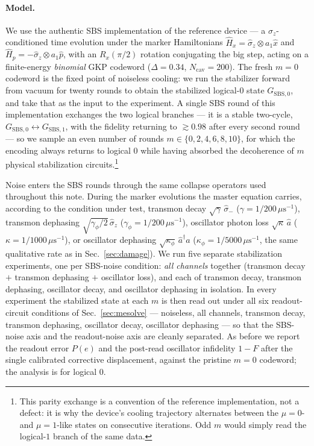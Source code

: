 \paragraph{Model.} We use the authentic SBS implementation of the reference
device --- a $\sigma_z$-conditioned time evolution under the marker Hamiltonians
$\hat H_x=\hat\sigma_z\otimes a_1\hat x$ and $\hat H_p=-\hat\sigma_z\otimes a_1\hat p$, with an
$R_x(\pi/2)$ rotation conjugating the big step, acting on a finite-energy \emph{binomial} GKP
codeword ($\Delta=0.34$, $N_{\mathrm{cav}}=200$). The fresh $m=0$ codeword is the fixed point of
noiseless cooling: we run the stabilizer forward from vacuum for twenty rounds to obtain the
stabilized logical-$0$ state $G_{\mathrm{SBS},0}$, and take that as the input to the experiment.
A single SBS round of this implementation exchanges the two logical branches --- it is a stable
two-cycle, $G_{\mathrm{SBS},0}\!\leftrightarrow\!G_{\mathrm{SBS},1}$, with the fidelity returning
to $\gtrsim0.98$ after every second round --- so we sample an even number of rounds
$m\in\{0,2,4,6,8,10\}$, for which the encoding always returns to logical $0$ while having absorbed
the decoherence of $m$ physical stabilization circuits.\footnote{This parity exchange is a
convention of the reference implementation, not a defect: it is why the device's cooling
trajectory alternates between the $\mu=0$- and $\mu=1$-like states on consecutive iterations. Odd
$m$ would simply read the logical-$1$ branch of the same data.}

Noise enters the SBS rounds through the same collapse operators used throughout this note. During
the marker evolutions the master equation carries, according to the condition under test, transmon
decay $\sqrt{\gamma}\,\hat\sigma_-$ ($\gamma=1/200\,\mu\mathrm{s}^{-1}$), transmon dephasing
$\sqrt{\gamma_\phi/2}\,\hat\sigma_z$ ($\gamma_\phi=1/200\,\mu\mathrm{s}^{-1}$), oscillator photon
loss $\sqrt{\kappa}\,\hat a$ ($\kappa=1/1000\,\mu\mathrm{s}^{-1}$), or oscillator dephasing
$\sqrt{\kappa_\phi}\,\hat a^\dagger\hat a$ ($\kappa_\phi=1/5000\,\mu\mathrm{s}^{-1}$, the same
qualitative rate as in Sec.~\ref{sec:damage}). We run five separate stabilization experiments, one
per SBS-noise condition: \emph{all channels} together (transmon decay $+$ transmon dephasing $+$
oscillator loss), and each of transmon decay, transmon dephasing, oscillator decay, and oscillator
dephasing in isolation. In every experiment the stabilized state at each $m$ is then read out under
all six readout-circuit conditions of Sec.~\ref{sec:mesolve} --- noiseless, all channels, transmon
decay, transmon dephasing, oscillator decay, oscillator dephasing --- so that the SBS-noise axis
and the readout-noise axis are cleanly separated. As before we report the readout error $P(e)$ and
the post-read oscillator infidelity $1-F$ after the single calibrated corrective displacement,
against the pristine $m=0$ codeword; the analysis is for logical $0$.

